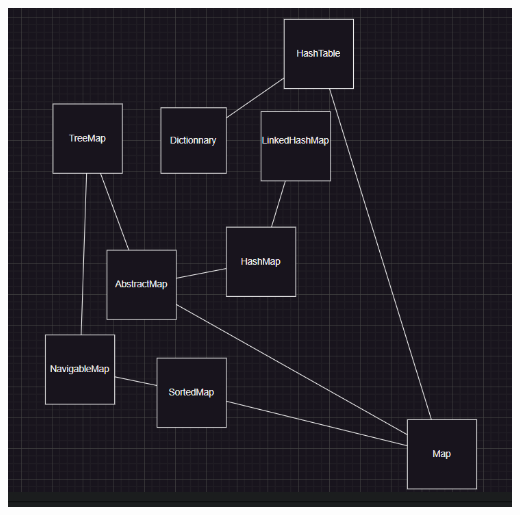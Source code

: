 \documentclass[12pt]{article}
\begin{document}
\begin{enumerate}
\includegraphics{P6P1Q3.png}\\

\end{enumerate}
\end{document}
